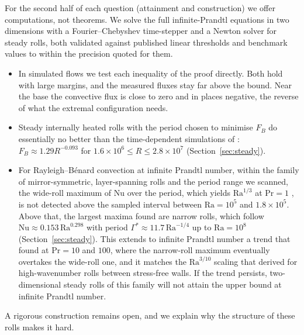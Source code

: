 For the second half of each question (attainment and construction) we offer computations, not theorems. We
solve the full infinite-Prandtl equations in two dimensions with a Fourier--Chebyshev time-stepper and a Newton
solver for steady rolls, both validated against published linear thresholds and benchmark values to within
the precision quoted for them.
\begin{itemize}
\item In simulated flows we test each inequality of the proof directly. Both hold with large margins, and the
measured fluxes stay far above the bound. Near the base the convective flux is close to zero and in places
negative, the reverse of what the extremal configuration needs.
\item Steady internally heated rolls with the period chosen to minimise $F_B$ do essentially no better than the
time-dependent simulations of \citet{ArslanRojas2025}: $F_B\approx1.29R^{-0.093}$ for
$1.6\times10^6\le R\le2.8\times10^7$ (Section~\ref{sec:steady}).
\item For Rayleigh--B\'enard convection at infinite Prandtl number, within the family of mirror-symmetric,
layer-spanning rolls and the period range we scanned, the wide-roll maximum of Nu over the period, which yields
$\mathrm{Ra}^{1/3}$ at $\mathrm{Pr}=1$ \citep{WenGoluskinDoering2022}, is not detected above the sampled interval between $\mathrm{Ra}=10^5$ and
$1.8\times10^5$. Above that, the largest maxima found are narrow rolls, which follow
$\mathrm{Nu}\approx0.153\,\mathrm{Ra}^{0.298}$ with period $\Gamma^*\approx11.7\,\mathrm{Ra}^{-1/4}$ up to
$\mathrm{Ra}=10^8$ (Section~\ref{sec:steady}). This extends to infinite Prandtl number a trend that
\citet{SondakSmithWaleffe2015} found at $\mathrm{Pr}=10$ and $100$, where the narrow-roll maximum eventually
overtakes the wide-roll one, and it matches the $\mathrm{Ra}^{3/10}$ scaling that \citet{WenEtAl2026} derived for
high-wavenumber rolls between stress-free walls. If the trend persists, two-dimensional steady rolls of this
family will not attain the upper bound at infinite Prandtl number.
\end{itemize}
A rigorous construction remains open, and we explain why the structure of these rolls makes it hard.

